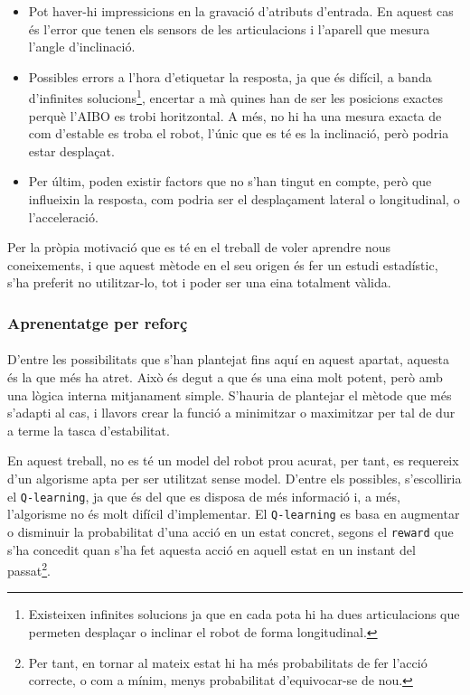 \documentclass[12pt,a4paper,final,twoside]{article}
\begin{document}
\begin{itemize}

\item Pot haver-hi impressicions en la gravació d'atributs d'entrada. En aquest cas és l'error que tenen els sensors de les articulacions i l'aparell que mesura l'angle d'inclinació.

\item Possibles errors a l'hora d'etiquetar la resposta, ja que és difícil, a banda d'infinites solucions\footnote{Existeixen infinites solucions ja que en cada pota hi ha dues articulacions que permeten desplaçar o inclinar el robot de forma longitudinal.}, encertar a mà quines han de ser les posicions exactes perquè l'AIBO es trobi horitzontal. A més, no hi ha una mesura exacta de com d'estable es troba el robot, l'únic que es té es la inclinació, però podria estar desplaçat.

\item Per últim, poden existir factors que no s'han tingut en compte, però que influeixin la resposta, com podria ser el desplaçament lateral o longitudinal, o l'acceleració.
\end{itemize}

Per la pròpia motivació que es té en el treball de voler aprendre nous coneixements, i que aquest mètode en el seu origen és fer un estudi estadístic, s'ha preferit no utilitzar-lo, tot i poder ser una eina totalment vàlida.

\subsubsection{Aprenentatge per reforç}

\paragraph{}D'entre les possibilitats que s'han plantejat fins aquí en aquest apartat, aquesta és la que més ha atret. Això és degut a que és una eina molt potent, però amb una lògica interna mitjanament simple. S'hauria de plantejar el mètode que més s'adapti al cas, i llavors crear la funció a minimitzar o maximitzar per tal de dur a terme la tasca d'estabilitat.

En aquest treball, no es té un model del robot prou acurat, per tant, es requereix d'un algorisme apta per ser utilitzat sense model. D'entre els possibles, s'escolliria el \texttt{Q-learning}, ja que és del que es disposa de més informació i, a més, l'algorisme no és molt difícil d'implementar. El \texttt{Q-learning} es basa en augmentar o disminuir la probabilitat d'una acció en un estat concret, segons el \texttt{reward} que s'ha concedit quan s'ha fet aquesta acció en aquell estat en un instant del passat\footnote{Per tant, en tornar al mateix estat hi ha més probabilitats de fer l'acció correcte, o com a mínim, menys probabilitat d'equivocar-se de nou.}.
\end{document}
